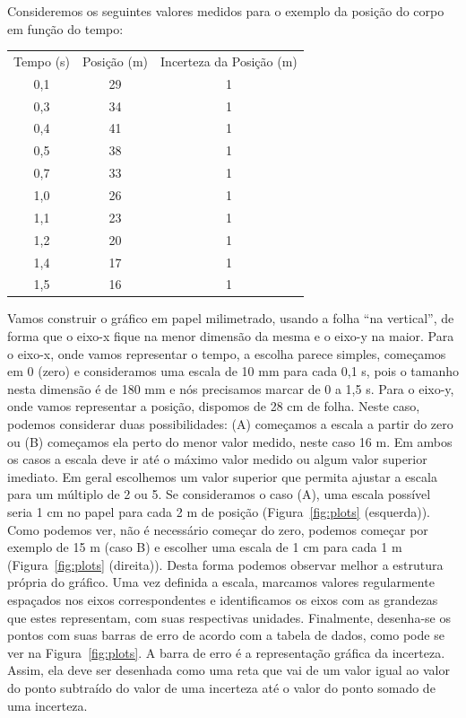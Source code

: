 Consideremos os seguintes valores medidos para o exemplo da posição do corpo em função do tempo: %
\vspace{-0.7cm}
\begin{center}
  \begin{tabular}{|c|c|c|}
  Tempo (s) & Posição (m)  & Incerteza da Posição (m)	\\
0,1	&	29 & 1 \\
0,3	&	34 & 1 \\
0,4	&	41 & 1 \\
0,5	&	38 & 1 \\ 
0,7	&	33 & 1 \\ 
1,0	&	26 & 1 \\
1,1	&	23 & 1 \\
1,2	&	20 & 1 \\
1,4	&	17 & 1 \\
1,5	&	16 & 1 \\
\end{tabular}
\vspace{-0.4cm}
\end{center}

Vamos construir o gráfico em papel milimetrado, usando a folha ``na vertical'', de forma que o eixo-x fique na menor dimensão da mesma e o eixo-y na maior. Para o eixo-x, onde vamos representar o tempo, a escolha parece simples, começamos em 0 (zero) e consideramos uma escala de 10 mm para cada 0,1 s, pois o tamanho nesta dimensão é de 180 mm e nós precisamos marcar de 0 a 1,5 s. Para o eixo-y, onde vamos representar a posição, dispomos de 28 cm de folha. Neste caso, podemos considerar duas possibilidades: (A) começamos a escala a partir do zero ou (B) começamos ela perto do menor valor medido, neste caso 16 m.  Em ambos  os casos a escala deve ir até o máximo valor medido ou algum valor superior imediato.  Em geral escolhemos um valor superior que permita ajustar a escala para um múltiplo de 2 ou 5. Se consideramos o caso (A), uma escala possível seria 1 cm no papel para cada 2 m de posição (Figura~\ref{fig:plots} (esquerda)). Como podemos ver, não é necessário começar do zero, podemos começar por exemplo de 15 m (caso B) e escolher uma escala de 1 cm para cada 1 m (Figura~\ref{fig:plots} (direita)). Desta forma podemos observar melhor a estrutura própria do gráfico. Uma vez definida a escala, marcamos valores regularmente espaçados nos eixos correspondentes e identificamos os eixos com as grandezas que estes representam, com suas respectivas unidades. Finalmente, desenha-se os  pontos com suas barras de erro de acordo com a tabela de dados, como pode se ver na Figura~\ref{fig:plots}. A barra de erro é a representação gráfica da incerteza. Assim, ela deve ser desenhada como uma reta que vai de um valor igual ao valor do ponto subtraído do valor de uma incerteza até o valor do ponto somado de uma incerteza.

